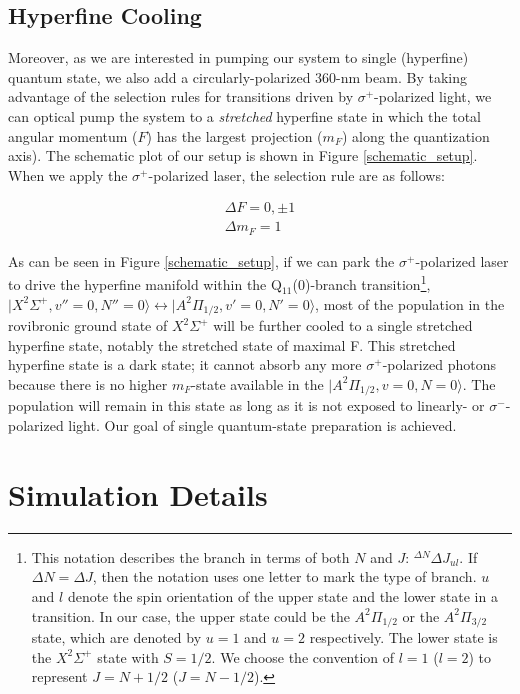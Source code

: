 \documentclass[nofootinbib,aip,jcp,reprint]{revtex4-1}
\begin{document}
\subsection{Hyperfine Cooling}
Moreover, as we are interested in pumping our system to single (hyperfine) quantum state, we also add a circularly-polarized 360-nm beam. By taking advantage of the selection rules for transitions driven by $\sigma^+$-polarized light, we can optical pump the system to a \textit{stretched} hyperfine state in which the total angular momentum ($F$) has the largest projection ($m_F$) along the quantization axis). The schematic plot of our setup is shown in Figure \ref{schematic_setup}. When we apply the $\sigma^+$-polarized laser, the selection rule are as follows:

\begin{align*}
\Delta F=0, \pm 1 \\
\Delta m_F=1
\end{align*}


As can be seen in Figure \ref{schematic_setup}, if we can park the $\sigma^+$-polarized laser to drive the hyperfine manifold within the Q$_{11}$(0)-branch transition\footnote[1]{This notation describes the branch in terms of both $N$ and $J$: $^{\Delta N}\Delta J_{ul}$. If $\Delta N = \Delta J$, then the notation uses one letter to mark the type of branch.  $u$ and $l$ denote the spin orientation of the upper state and the lower state in a transition. In our case, the upper state could be the $A^2\Pi_{1/2}$ or the $A^2\Pi_{3/2}$ state, which are denoted by $u=1$  and $u=2$ respectively. The lower state is the $X^2 \Sigma^{+}$ state with $S=1/2$. We choose the convention of $l=1$ ($l=2$) to represent $J=N+1/2$ ($J=N-1/2$).}, $\lvert X^2\Sigma^+, v''=0, N''=0\rangle \leftrightarrow \lvert A^2\Pi_{1/2}, v'=0, N'=0\rangle$, most of the population in the rovibronic ground state of $X^2 \Sigma^{+}$ will be further cooled to a single stretched hyperfine state, notably the stretched state of maximal F. This stretched hyperfine state is a dark state; it cannot absorb any more $\sigma^+$-polarized photons because there is no higher $m_F$-state available in the $\lvert A^2\Pi_{1/2}, v=0, N=0\rangle$. The population will remain in this state as long as it is not exposed to linearly- or $\sigma^-$-polarized light. Our goal of single quantum-state preparation is achieved.

\section{Simulation Details}
\end{document}
